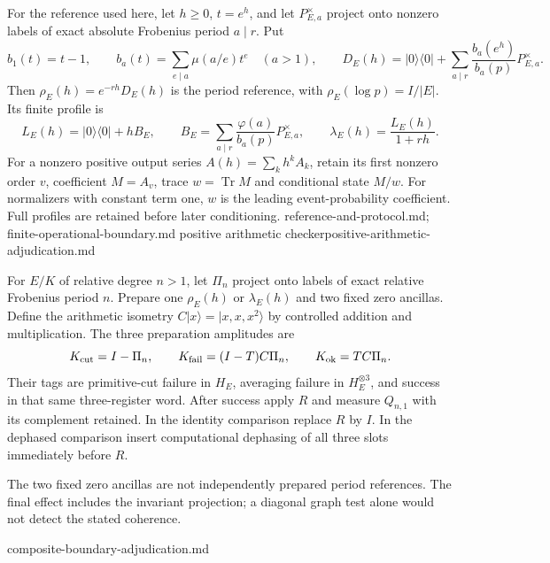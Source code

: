 For the reference used here, let $h\geq0$, $t=e^h$, and let
$P_{E,a}^{\times}$ project onto nonzero labels of exact absolute Frobenius
period $a\mid r$. Put
\[
 b_1(t)=t-1,\qquad b_a(t)=\sum_{e\mid a}\mu(a/e)t^e\quad(a>1),
 \qquad
 D_E(h)=|0\rangle\langle0|+
      \sum_{a\mid r}\frac{b_a(e^h)}{b_a(p)}P_{E,a}^{\times}.
\]
Then $\rho_E(h)=e^{-rh}D_E(h)$ is the period reference, with
$\rho_E(\log p)=I/|E|$. Its finite profile is
\[
 L_E(h)=|0\rangle\langle0|+hB_E,\qquad
 B_E=\sum_{a\mid r}\frac{\varphi(a)}{b_a(p)}P_{E,a}^{\times},
 \qquad \lambda_E(h)=\frac{L_E(h)}{1+rh}.
\]
For a nonzero positive output series $A(h)=\sum_k h^kA_k$, retain its
first nonzero order $v$, coefficient $M=A_v$, trace $w=\operatorname{Tr}M$
and conditional state $M/w$. For normalizers with constant term one, $w$
is the leading event-probability coefficient. Full profiles are retained
before later conditioning.
{reference-and-protocol.md; finite-operational-boundary.md}
{positive arithmetic checker}{positive-arithmetic-adjudication.md}

\begin{definition}
For $E/K$ of relative degree $n>1$, let $\Pi_n$ project onto labels of
exact relative Frobenius period $n$. Prepare one $\rho_E(h)$ or
$\lambda_E(h)$ and two fixed zero ancillas. Define the arithmetic isometry
$C|x\rangle=|x,x,x^2\rangle$ by controlled addition and multiplication.
The three preparation amplitudes are
\[
 K_{\rm cut}=I-\Pi_n,\qquad
 K_{\rm fail}=(I-T)C\Pi_n,\qquad K_{\rm ok}=TC\Pi_n.
\]
Their tags are primitive-cut failure in $H_E$, averaging failure in
$H_E^{\otimes3}$, and success in that same three-register word.
After success apply $R$ and measure $Q_{n,1}$ with its complement retained.
In the identity comparison replace $R$ by $I$. In the dephased comparison
insert computational dephasing of all three slots immediately before $R$.
\end{definition}
\begin{scope}
The two fixed zero ancillas are not independently prepared period
references. The final effect includes the invariant projection; a diagonal
graph test alone would not detect the stated coherence.
\end{scope}
{composite-boundary-adjudication.md}

